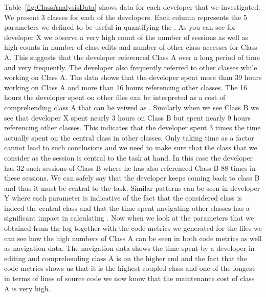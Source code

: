Table~\ref{fig:ClassAnalysisData} shows data for each developer that we investigated. We present 3 classes for each of the developers. Each column represents the 5 parameters we defined to be useful in quantifying the \TD. As you can see for developer X we observe a very high count of the number of sessions as well as high counts in number of class edits and number of other class accesses for Class A. This suggests that the developer referenced Class A over a long period of time and very frequently. The developer also frequently referred to other classes while working on Class A. The data shows that the developer spent more than 39 hours working on Class A and more than 16 hours referencing other classes. The 16 hours the developer spent on other files can be interpreted as a cost of comprehending class A that can be veiwed as  \TD. Similarly when we see Class B we see that developer X spent nearly 3 hours on Class B but spent nearly 9 hours referencing other classes. This indicates that the developer spent 3 times the time actually spent on the central class in other classes. Only taking time as a factor cannot lead to such conclusions and we need to make sure that the class that we consider as the session is central to the task at hand. In this case the developer has 32 such sessions of Class B where he has also referenced Class B 88 times in these sessions. We can safely say that the developer keeps coming back to class B and thus it must be central to the task. Similar patterns can be seen in developer Y where each parameter is indicative of the fact that the considered class is indeed the central class and that the time spent navigating other classes has a significant impact in calculating \TD. Now when we look at the parameters that we obtained from the log together with the code metrics we generated for the files we can see how the high numbers of Class A can be seen in both code metrics as well as navigation data. The navigation data shows the time spent by a developer in editing and comprehending class A is on the higher end and the fact that the code metrics shows us that it is the highest coupled class and one of the longest in terms of lines of source code we now know that the maintenance cost of class A is very high.
